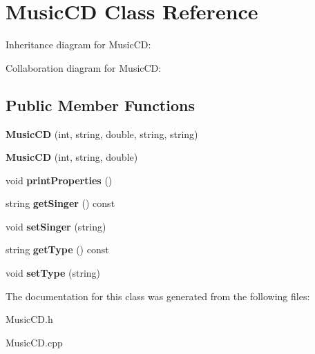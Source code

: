 \hypertarget{classMusicCD}{}\section{Music\+CD Class Reference}
\label{classMusicCD}


Inheritance diagram for Music\+CD\+:


Collaboration diagram for Music\+CD\+:
\subsection*{Public Member Functions}
\begin{DoxyCompactItemize}
\item 
{\bfseries Music\+CD} (int, string, double, string, string)\hypertarget{classMusicCD_a334b0680f6901e6d4f34791aecf075fd}{}\label{classMusicCD_a334b0680f6901e6d4f34791aecf075fd}

\item 
{\bfseries Music\+CD} (int, string, double)\hypertarget{classMusicCD_aecdf5af2b88efcd0f3e0d5722f0316d3}{}\label{classMusicCD_aecdf5af2b88efcd0f3e0d5722f0316d3}

\item 
void {\bfseries print\+Properties} ()\hypertarget{classMusicCD_a86f5945b7f17a544ccb286e38058b550}{}\label{classMusicCD_a86f5945b7f17a544ccb286e38058b550}

\item 
string {\bfseries get\+Singer} () const \hypertarget{classMusicCD_a846cbd7718216e12fd65e345abb6e1f4}{}\label{classMusicCD_a846cbd7718216e12fd65e345abb6e1f4}

\item 
void {\bfseries set\+Singer} (string)\hypertarget{classMusicCD_a1a425710dfc010eb5f2bbde63d53f89d}{}\label{classMusicCD_a1a425710dfc010eb5f2bbde63d53f89d}

\item 
string {\bfseries get\+Type} () const \hypertarget{classMusicCD_ae287ca740f7ad4c70e59ef06f031680a}{}\label{classMusicCD_ae287ca740f7ad4c70e59ef06f031680a}

\item 
void {\bfseries set\+Type} (string)\hypertarget{classMusicCD_a1b1ea75abec58c4154dee842f9833995}{}\label{classMusicCD_a1b1ea75abec58c4154dee842f9833995}

\end{DoxyCompactItemize}


The documentation for this class was generated from the following files\+:\begin{DoxyCompactItemize}
\item 
Music\+C\+D.\+h\item 
Music\+C\+D.\+cpp\end{DoxyCompactItemize}
